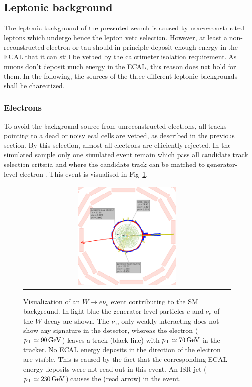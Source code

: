 \subsection{Leptonic background}
\label{sec:LeptonicBkg}

The leptonic background of the presented search is caused by non-reconstructed leptons which undergo hence the lepton veto selection.
However, at least a non-reconstructed electron or tau should in principle deposit enough energy in the ECAL that it can still be vetoed by the calorimeter isolation requirement.
As muons don't deposit much energy in the ECAL, this reason does not hold for them.
In the following, the sources of the three different leptonic backgrounds shall be charectized.

\subsubsection*{Electrons}
To avoid the background source from unreconstructed electrons, all tracks pointing to a dead or noisy ecal cells are vetoed, as described in the previous section.
By this selection, almost all electrons are efficiently rejected.
In the simulated \WJets sample only one simulated event remain which pass all candidate track selection criteria and where the candidate track can be matched to generator-level electron .
This event is visualised in Fig~\ref{fig:LostElectron}. 
\begin{figure}[!tb]
  \centering 
  \begin{tabular}{c}
    \includegraphics[width=0.49\textwidth]{figures/analysis/Electron_lumi_279317_event_111637553.png}
  \end{tabular}
  \caption{Visualization of an $W\rightarrow e\nu_e$ event contributing to the SM background. 
           In light blue the generator-level particles $e$ and $\nu_e$ of the $W$ decay are shown. 
           The $\nu_e$, only weakly interacting does not show any signature in the detector, whereas the electron ($p_{\text{T}}\simeq 90\,\text{Ge}\kern-0.06667em\text{V}$) leaves a track (black line) with \mbox{$p_{\text{T}}\simeq 70\,\text{Ge}\kern-0.06667em\text{V}$} in the tracker. 
           No ECAL energy deposits in the direction of the electron are visible. 
           This is caused by the fact that the corresponding ECAL energy deposits were not read out in this event.
           An ISR jet ($p_{\text{T}}\simeq 230\,\text{Ge}\kern-0.06667em\text{V}$) causes the \met (read arrow) in the event. }
  \label{fig:LostElectron}
\end{figure}
